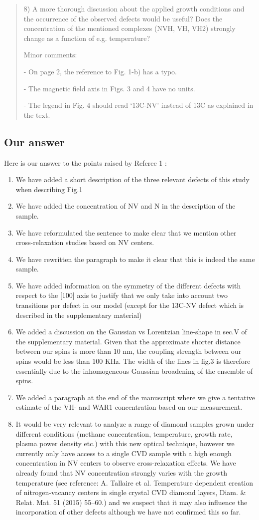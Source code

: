 \documentclass{article}
\begin{document}
\begin{quote}
8) A more thorough discussion about the applied growth conditions and the occurrence of the observed defects would be useful? Does the concentration of the mentioned complexes (NVH, VH, VH2) strongly change as a function of e.g. temperature?

Minor comments:

- On page 2, the reference to Fig. 1-b) has a typo.

- The magnetic field axis in Figs. 3 and 4 have no units.

- The legend in Fig. 4 should read ‘13C-NV’ instead of 13C as explained in the text.
\end{quote}

\subsection*{Our answer}
Here is our answer to the points raised by Referee 1 :
\begin{enumerate}
\item We have added a short description of the three relevant defects of this study when describing Fig.1
\item We have added the concentration of NV and N in the description of the sample.
\item We have reformulated the sentence to make clear that we mention other cross-relaxation studies based on NV centers.
\item We have rewritten the paragraph to make it clear that this is indeed the same sample.
\item We have added information on the symmetry of the different defects with respect to the [100] axis to justify that we only take into account two transitions per defect in our model (except for the 13C-NV defect which is described in the supplementary material)
\item We added a discussion on the Gaussian vs Lorentzian line-shape in sec.V of the supplementary material. Given that the approximate shorter distance between our spins is more than 10 nm, the coupling strength between our spins would be less than 100 KHz. The width of the lines in fig.3 is therefore essentially due to the inhomogeneous Gaussian broadening of the ensemble of spins.
\item We added a paragraph at the end of the manuscript where we give a tentative estimate of the VH- and WAR1 concentration based on our measurement.
\item It would be very relevant to analyze a range of diamond samples grown under different conditions (methane concentration, temperature, growth rate, plasma power density etc.) with this new optical technique, however we currently only have access to a single CVD sample with a high enough concentration in NV centers to observe cross-relaxation effects. We have already found that NV concentration strongly varies with the growth temperature (see reference: A. Tallaire et al. Temperature dependent creation of nitrogen-vacancy centers in single crystal CVD diamond layers, Diam. \& Relat. Mat. 51 (2015) 55–60.) and we suspect that it may also influence the incorporation of other defects although we have not confirmed this so far. 
\end{enumerate}
\end{document}

